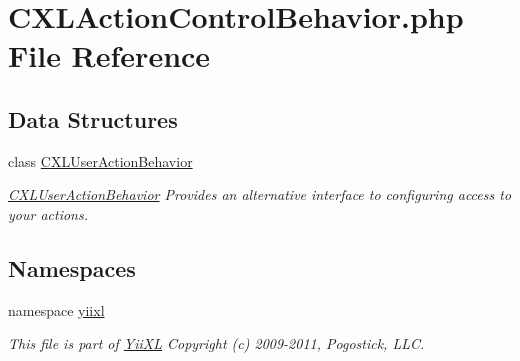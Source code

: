 \hypertarget{CXLActionControlBehavior_8php}{
\section{CXLActionControlBehavior.php File Reference}
\label{CXLActionControlBehavior_8php}
}
\subsection*{Data Structures}
\begin{DoxyCompactItemize}
\item 
class \hyperlink{classCXLUserActionBehavior}{CXLUserActionBehavior}
\begin{DoxyCompactList}\small\item\em \hyperlink{classCXLUserActionBehavior}{CXLUserActionBehavior} Provides an alternative interface to configuring access to your actions. \item\end{DoxyCompactList}\end{DoxyCompactItemize}
\subsection*{Namespaces}
\begin{DoxyCompactItemize}
\item 
namespace \hyperlink{namespaceyiixl}{yiixl}


\begin{DoxyCompactList}\small\item\em This file is part of \hyperlink{classYiiXL}{YiiXL} Copyright (c) 2009-\/2011, Pogostick, LLC. \item\end{DoxyCompactList}

\end{DoxyCompactItemize}
